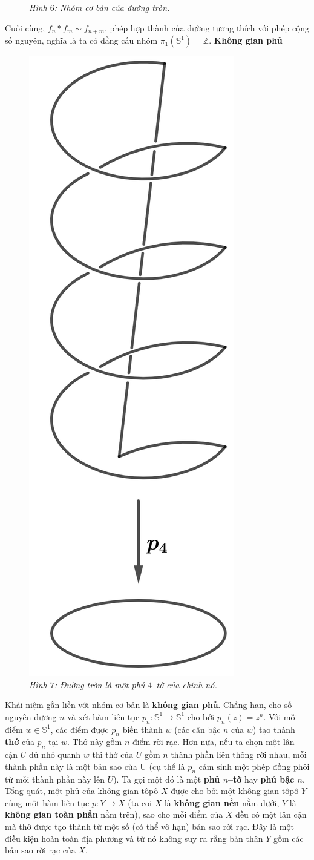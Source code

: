 \begin{multicols}{2}
\begin{figure}[H]
		\caption{\small\textit{\color{duongvaotoanhoc}Hình $6$: Nhóm cơ bản của đường tròn.}}
		\vspace*{-10pt}
	\end{figure}
	Cuối cùng, $f_n \ast f_m \sim f_{n+m}$, phép hợp thành của đường tương thích với phép cộng số nguyên, nghĩa là ta có đẳng cấu nhóm $\pi_1(\mathbb{S}^1) = \mathbb{Z}$.
	\vskip 0.1cm
	\textbf{\color{duongvaotoanhoc}Không gian phủ}
	\begin{figure}[H]
		\vspace*{-5pt}
		\centering
		\captionsetup{labelformat= empty, justification=centering}
		\includegraphics[width= 0.2\linewidth]{h7.png}
		\caption{\small\textit{\color{duongvaotoanhoc}Hình $7$: Đường tròn là một phủ $4$--tờ của chính nó.}}
		\vspace*{-10pt}
	\end{figure}
	Khái niệm gắn liền với nhóm cơ bản là {\bf\color{duongvaotoanhoc} không gian phủ}. Chẳng hạn, cho số nguyên dương $n$ và xét hàm liên tục $p_n: \mathbb{S}^1 \to \mathbb{S}^1$ cho bởi $p_n(z) = z^n$. Với mỗi điểm $w \in \mathbb{S}^1$, các điểm được $p_n$ biến thành $w$ (các căn bậc $n$ của $w$) tạo thành {\bf\color{duongvaotoanhoc} thớ} của $p_n$ tại $w$. Thớ này gồm $n$ điểm rời rạc. Hơn nữa, nếu ta chọn một lân cận $U$ đủ nhỏ quanh $w$ thì thớ của $U$ gồm $n$ thành phần liên thông rời nhau, mỗi thành phần này là một bản sao của U (cụ thể là $p_n$ cảm sinh một phép đồng phôi từ mỗi thành phần này lên $U$). Ta gọi một đó là một {\bf\color{duongvaotoanhoc} phủ $n$--tờ} hay {\bf\color{duongvaotoanhoc} phủ bậc $n$}. 
	\vskip 0.1cm
	Tổng quát, một phủ của không gian tôpô $X$ được cho bởi một không gian tôpô $Y$ cùng một hàm liên tục $p: Y \to X$ (ta coi $X$ là {\bf\color{duongvaotoanhoc} không gian nền} nằm dưới, $Y$ là {\bf\color{duongvaotoanhoc} không gian toàn phần} nằm trên), sao cho mỗi điểm của $X$ đều có một lân cận mà thớ được tạo thành từ một số (có thể vô hạn) bản sao rời rạc. Đây là một điều kiện hoàn toàn địa phương và từ nó không suy ra rằng bản thân $Y$ gồm các bản sao rời rạc của $X$.

\end{multicols}
